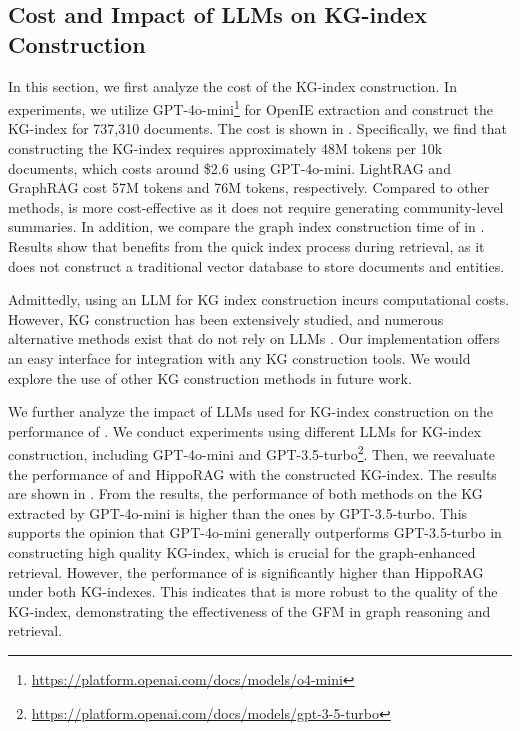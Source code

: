 
\subsection{Cost and Impact of LLMs on KG-index Construction}\label{app:cost}

In this section, we first analyze the cost of the KG-index construction. In experiments, we utilize GPT-4o-mini\footnote{\url{https://platform.openai.com/docs/models/o4-mini}} for OpenIE extraction and construct the KG-index for 737,310 documents. The cost is shown in . Specifically, we find that constructing the KG-index requires approximately 48M tokens per 10k documents, which costs around \$2.6 using GPT-4o-mini. LightRAG and GraphRAG cost 57M tokens and 76M tokens, respectively. Compared to other methods, \ourmethod is more cost-effective as it does not require generating community-level summaries. In addition, we compare the graph index construction time of \ourmethod in . Results show that \ourmethod benefits from the quick index process during retrieval, as it does not construct a traditional vector database to store documents and entities.

Admittedly, using an LLM for KG index construction incurs computational costs. However, KG construction has been extensively studied, and numerous alternative methods exist that do not rely on LLMs \citep{zhong2023comprehensive}. Our implementation offers an easy interface for integration with any KG construction tools. We would explore the use of other KG construction methods in future work.

We further analyze the impact of LLMs used for KG-index construction on the performance of \ourmethod. We conduct experiments using different LLMs for KG-index construction, including GPT-4o-mini and GPT-3.5-turbo\footnote{\url{https://platform.openai.com/docs/models/gpt-3-5-turbo}}. Then, we reevaluate the performance of \ourmethod and HippoRAG with the constructed KG-index. The results are shown in . From the results, the performance of both methods on the KG extracted by GPT-4o-mini is higher than the ones by GPT-3.5-turbo. This supports the opinion that GPT-4o-mini generally outperforms GPT-3.5-turbo in constructing high quality KG-index, which is crucial for the graph-enhanced retrieval. However, the performance of \ourmethod is significantly higher than HippoRAG under both KG-indexes. This indicates that \ourmethod is more robust to the quality of the KG-index, demonstrating the effectiveness of the GFM in graph reasoning and retrieval. 

